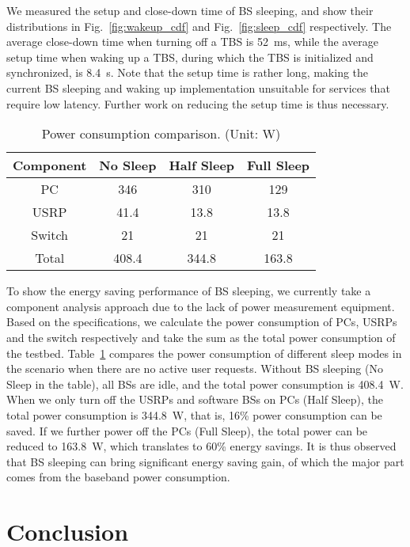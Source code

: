 \documentclass[conference]{IEEEtran}
\begin{document}
We measured the setup and close-down time of BS sleeping, and show their
distributions
in Fig.~\ref{fig:wakeup_cdf} and Fig.~\ref{fig:sleep_cdf} respectively.
The average close-down time when turning off a TBS is \SI{52}{ms},
while the average setup time when waking up a TBS, during which the TBS
is initialized and synchronized, is \SI{8.4}{s}.
Note that the setup time is rather long, making the current BS sleeping and waking up
implementation unsuitable for services
that require low latency. Further work on reducing the setup time is thus
necessary.

\begin{table}[!t]
  \renewcommand{\arraystretch}{1.3}
  \caption{Power consumption comparison. (Unit: \si{W})}
  \label{tab:sav}
  \centering
  \begin{tabular}{c|c|c|c}
    \hline
    Component & No Sleep & Half Sleep &Full Sleep\\
    \hline
    PC & 346 & 310 &129 \\
    \hline
    USRP &41.4 & 13.8 & 13.8\\
    \hline
    Switch & 21 & 21 & 21\\
    \hline
    Total &408.4 &344.8 &163.8\\
    \hline
\end{tabular}
\end{table}

To show the energy saving performance of BS sleeping,
we currently take a component analysis approach due to the lack of power measurement equipment.
Based on the specifications,
we calculate the power consumption of PCs, USRPs and the switch respectively
and take the sum as the total power consumption of the testbed.
Table~\ref{tab:sav} compares the power consumption of different sleep modes in the
scenario when there are no active user requests.
Without BS sleeping (No Sleep in the table), all BSs are idle, and
the total power consumption is \SI{408.4}{W}.
When we only turn off the USRPs and software BSs on PCs (Half Sleep),
the total power consumption is \SI{344.8}{W}, that is, 16\% power consumption can be
saved.
If we further power off the PCs (Full Sleep), the total power can be reduced to \SI{163.8}{W},
which translates to 60\% energy savings.
It is thus observed that BS sleeping can bring significant energy saving gain,
of which the major part comes from the baseband power consumption.

\section{Conclusion}
\label{sec:con}
\end{document}
